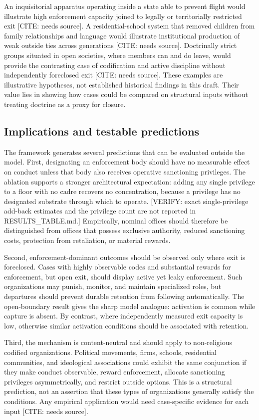\documentclass[12pt]{article}
\begin{document}
An inquisitorial apparatus operating inside a state able to prevent flight would illustrate high enforcement capacity joined to legally or territorially restricted exit [CITE: needs source]. A residential-school system that removed children from family relationships and language would illustrate institutional production of weak outside ties across generations [CITE: needs source]. Doctrinally strict groups situated in open societies, where members can and do leave, would provide the contrasting case of codification and active discipline without independently foreclosed exit [CITE: needs source]. These examples are illustrative hypotheses, not established historical findings in this draft. Their value lies in showing how cases could be compared on structural inputs without treating doctrine as a proxy for closure.

\subsection{Implications and testable predictions}

The framework generates several predictions that can be evaluated outside the model. First, designating an enforcement body should have no measurable effect on conduct unless that body also receives operative sanctioning privileges. The ablation supports a stronger architectural expectation: adding any single privilege to a floor with no cadre recovers no concentration, because a privilege has no designated substrate through which to operate. [VERIFY: exact single-privilege add-back estimates and the privilege count are not reported in RESULTS_TABLE.md.] Empirically, nominal offices should therefore be distinguished from offices that possess exclusive authority, reduced sanctioning costs, protection from retaliation, or material rewards.

Second, enforcement-dominant outcomes should be observed only where exit is foreclosed. Cases with highly observable codes and substantial rewards for enforcement, but open exit, should display active yet leaky enforcement. Such organizations may punish, monitor, and maintain specialized roles, but departures should prevent durable retention from following automatically. The open-boundary result gives the sharp model analogue: activation is common while capture is absent. By contrast, where independently measured exit capacity is low, otherwise similar activation conditions should be associated with retention.

Third, the mechanism is content-neutral and should apply to non-religious codified organizations. Political movements, firms, schools, residential communities, and ideological associations could exhibit the same conjunction if they make conduct observable, reward enforcement, allocate sanctioning privileges asymmetrically, and restrict outside options. This is a structural prediction, not an assertion that these types of organizations generally satisfy the conditions. Any empirical application would need case-specific evidence for each input [CITE: needs source].
\end{document}
